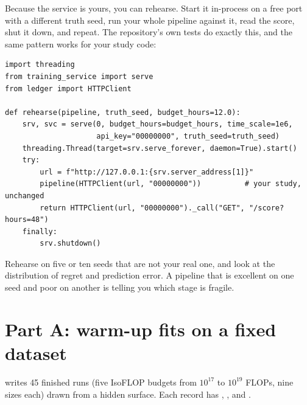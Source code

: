 Because the service is yours, you can rehearse. Start it in-process on a free port with a
different truth seed, run your whole pipeline against it, read the score, shut it down, and
repeat. The repository's own tests do exactly this, and the same pattern works for your study code:
\begin{lstlisting}[caption={Starting a throw-away service for a rehearsal (pattern from \code{test\_p3\_infra.py}).},label={lst:proj3:rehearse}]
import threading
from training_service import serve
from ledger import HTTPClient

def rehearse(pipeline, truth_seed, budget_hours=12.0):
    srv, svc = serve(0, budget_hours=budget_hours, time_scale=1e6,
                     api_key="00000000", truth_seed=truth_seed)
    threading.Thread(target=srv.serve_forever, daemon=True).start()
    try:
        url = f"http://127.0.0.1:{srv.server_address[1]}"
        pipeline(HTTPClient(url, "00000000"))          # your study, unchanged
        return HTTPClient(url, "00000000")._call("GET", "/score?hours=48")
    finally:
        srv.shutdown()
\end{lstlisting}
Rehearse on five or ten seeds that are not your real one, and look at the distribution of regret
and prediction error. A pipeline that is excellent on one seed and poor on another is telling
you which stage is fragile.

\section{Part A: warm-up fits on a fixed dataset}\label{sec:proj3:partA}

 writes 45 finished runs (five IsoFLOP budgets from $10^{17}$ to
$10^{19}$ FLOPs, nine sizes each) drawn from a hidden surface. Each record has
, ,  and .


